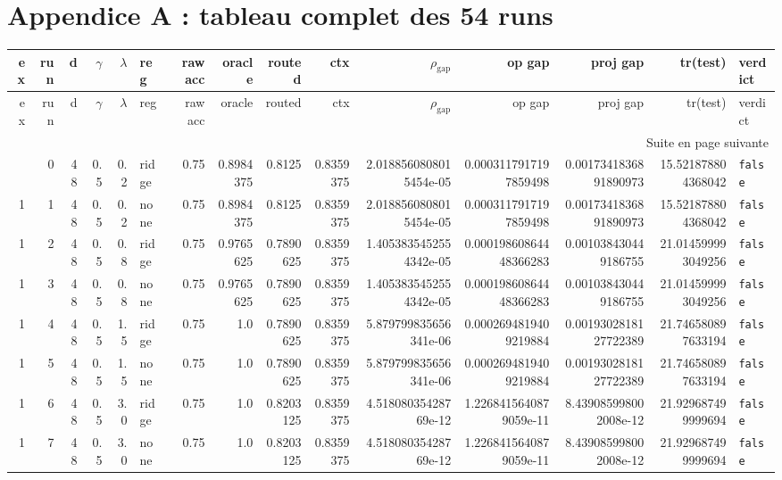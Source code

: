 \documentclass[11pt,a4paper]{article}
\begin{document}
\section*{Appendice A : tableau complet des 54 runs}
\begin{landscape}
\scriptsize
\setlength{\tabcolsep}{3pt}
\begin{longtable}{r r r r r l r r r r r r r r l}
\toprule
ex & run & d & $\gamma$ & $\lambda$ & reg & raw acc & oracle & routed & ctx & $\rho_{\mathrm{gap}}$ & op gap & proj gap & tr(test) & verdict\\
\midrule
\endfirsthead
\toprule
ex & run & d & $\gamma$ & $\lambda$ & reg & raw acc & oracle & routed & ctx & $\rho_{\mathrm{gap}}$ & op gap & proj gap & tr(test) & verdict\\
\midrule
\endhead
\midrule
\multicolumn{15}{r}{Suite en page suivante}\\
\endfoot
\bottomrule
\endlastfoot
1 & 0 & 48 & 0.5 & 0.2 & ridge & 0.75 & 0.8984375 & 0.8125 & 0.8359375 & 2.0188560808015454e-05 & 0.0003117917197859498 & 0.0017341836891890973 & 15.521878804368042 & \texttt{false} \\
1 & 1 & 48 & 0.5 & 0.2 & none & 0.75 & 0.8984375 & 0.8125 & 0.8359375 & 2.0188560808015454e-05 & 0.0003117917197859498 & 0.0017341836891890973 & 15.521878804368042 & \texttt{false} \\
1 & 2 & 48 & 0.5 & 0.8 & ridge & 0.75 & 0.9765625 & 0.7890625 & 0.8359375 & 1.4053835452554342e-05 & 0.00019860864448366283 & 0.001038430449186755 & 21.014599993049256 & \texttt{false} \\
1 & 3 & 48 & 0.5 & 0.8 & none & 0.75 & 0.9765625 & 0.7890625 & 0.8359375 & 1.4053835452554342e-05 & 0.00019860864448366283 & 0.001038430449186755 & 21.014599993049256 & \texttt{false} \\
1 & 4 & 48 & 0.5 & 1.5 & ridge & 0.75 & 1.0 & 0.7890625 & 0.8359375 & 5.879799835656341e-06 & 0.0002694819409219884 & 0.0019302818127722389 & 21.746580897633194 & \texttt{false} \\
1 & 5 & 48 & 0.5 & 1.5 & none & 0.75 & 1.0 & 0.7890625 & 0.8359375 & 5.879799835656341e-06 & 0.0002694819409219884 & 0.0019302818127722389 & 21.746580897633194 & \texttt{false} \\
1 & 6 & 48 & 0.5 & 3.0 & ridge & 0.75 & 1.0 & 0.8203125 & 0.8359375 & 4.51808035428769e-12 & 1.2268415640879059e-11 & 8.439085998002008e-12 & 21.929687499999694 & \texttt{false} \\
1 & 7 & 48 & 0.5 & 3.0 & none & 0.75 & 1.0 & 0.8203125 & 0.8359375 & 4.51808035428769e-12 & 1.2268415640879059e-11 & 8.439085998002008e-12 & 21.929687499999694 & \texttt{false} \\

\end{longtable}
\end{landscape}
\end{document}

